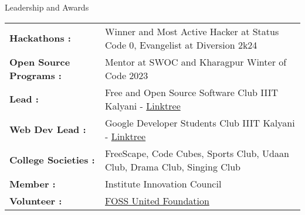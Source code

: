 \documentclass{resume} %
\begin{document}
\begin{rSection}{Leadership and Awards}

\begin{tabular}{ @{} >{\bfseries}l @{\hspace{6ex}} l }
Hackathons : & Winner and Most Active Hacker at Status Code 0, Evangelist at Diversion 2k24 \\
Open Source Programs : & Mentor at SWOC and Kharagpur Winter of Code 2023 \\
Lead : & Free and Open Source Software Club IIIT Kalyani - \href{https://fossclub.bio.link}{Linktree} \\
Web Dev Lead : & Google Developer Students Club IIIT Kalyani - \href{https://gdsc.bio.link}{Linktree} \\
College Societies : & FreeScape, Code Cubes, Sports Club, Udaan Club, Drama Club, Singing Club \\
Member : & Institute Innovation Council \\
Volunteer : & \href{https://fossunited.org/}{FOSS United Foundation} \\
\end{tabular}\\
\end{rSection}
\end{document}
